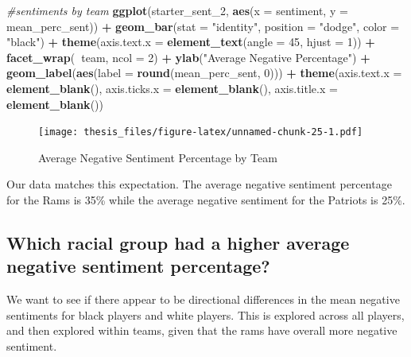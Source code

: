 \documentclass[12pt,twoside]{reedthesis}
\newenvironment{Shaded}{\begin{snugshade}}{\end{snugshade}}
\newcommand{\KeywordTok}[1]{\textcolor[rgb]{0.13,0.29,0.53}{\textbf{#1}}}
\newcommand{\DataTypeTok}[1]{\textcolor[rgb]{0.13,0.29,0.53}{#1}}
\newcommand{\DecValTok}[1]{\textcolor[rgb]{0.00,0.00,0.81}{#1}}
\newcommand{\StringTok}[1]{\textcolor[rgb]{0.31,0.60,0.02}{#1}}
\newcommand{\CommentTok}[1]{\textcolor[rgb]{0.56,0.35,0.01}{\textit{#1}}}
\newcommand{\OperatorTok}[1]{\textcolor[rgb]{0.81,0.36,0.00}{\textbf{#1}}}
\newcommand{\NormalTok}[1]{#1}
\begin{document}
\small
\begin{Shaded}
\begin{Highlighting}[]
\CommentTok{#sentiments by team}
\KeywordTok{ggplot}\NormalTok{(starter_sent_}\DecValTok{2}\NormalTok{, }\KeywordTok{aes}\NormalTok{(}\DataTypeTok{x =}\NormalTok{ sentiment, }\DataTypeTok{y =}\NormalTok{ mean_perc_sent)) }\OperatorTok{+}
\StringTok{  }\KeywordTok{geom_bar}\NormalTok{(}\DataTypeTok{stat =} \StringTok{"identity"}\NormalTok{, }\DataTypeTok{position =} \StringTok{"dodge"}\NormalTok{, }\DataTypeTok{color =} \StringTok{"black"}\NormalTok{) }\OperatorTok{+}
\StringTok{  }\KeywordTok{theme}\NormalTok{(}\DataTypeTok{axis.text.x =} \KeywordTok{element_text}\NormalTok{(}\DataTypeTok{angle =} \DecValTok{45}\NormalTok{, }\DataTypeTok{hjust =} \DecValTok{1}\NormalTok{)) }\OperatorTok{+}\StringTok{ }
\StringTok{  }\KeywordTok{facet_wrap}\NormalTok{(}\OperatorTok{~}\NormalTok{team, }\DataTypeTok{ncol =} \DecValTok{2}\NormalTok{) }\OperatorTok{+}
\StringTok{  }\KeywordTok{ylab}\NormalTok{(}\StringTok{"Average Negative Percentage"}\NormalTok{) }\OperatorTok{+}
\StringTok{  }\KeywordTok{geom_label}\NormalTok{(}\KeywordTok{aes}\NormalTok{(}\DataTypeTok{label =} \KeywordTok{round}\NormalTok{(mean_perc_sent, }\DecValTok{0}\NormalTok{))) }\OperatorTok{+}
\StringTok{  }\KeywordTok{theme}\NormalTok{(}\DataTypeTok{axis.text.x =} \KeywordTok{element_blank}\NormalTok{(), }
        \DataTypeTok{axis.ticks.x =} \KeywordTok{element_blank}\NormalTok{(), }
        \DataTypeTok{axis.title.x =} \KeywordTok{element_blank}\NormalTok{())}
\end{Highlighting}
\end{Shaded}
\begin{figure}
\centering
\texttt{[image: thesis\_files/figure-latex/unnamed-chunk-25-1.pdf]}
\caption{\label{fig:unnamed-chunk-25}Average Negative Sentiment Percentage
by Team}
\end{figure}
\normalsize
Our data matches this expectation. The average negative sentiment
percentage for the Rams is 35\% while the average negative sentiment for
the Patriots is 25\%.

\subsection{Which racial group had a higher average negative sentiment
percentage?}\label{which-racial-group-had-a-higher-average-negative-sentiment-percentage}

We want to see if there appear to be directional differences in the mean
negative sentiments for black players and white players. This is
explored across all players, and then explored within teams, given that
the rams have overall more negative sentiment.
\end{document}

